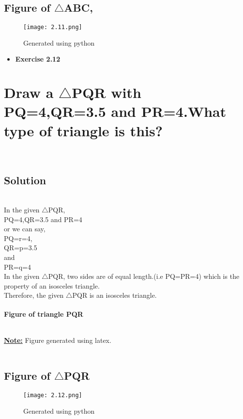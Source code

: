 \documentclass[a4paper,12pt]{article}
\begin{document}
\subsection{Figure of $\triangle$ABC,}
\begin{figure}[htp]
    \centering
    \texttt{[image: 2.11.png]}
    \caption{Generated using python}
    \label{fig:2}
\end{figure}
 \newpage
 \begin{itemize}
	    \item \Large\textbf{Exercise 2.12}
	\end{itemize}
	\section{Draw a $\triangle$PQR with PQ=4,QR=3.5 and PR=4.What type of triangle is this?}\\
    	
\subsection{Solution} \\
  In the given $\triangle$PQR, \\
   PQ=4,QR=3.5 and PR=4\\
   or we can say,\\
   PQ=r=4,\\QR=p=3.5\\ and\\ PR=q=4\\
  
   In the given $\triangle$PQR, two sides are of equal length.(i.e PQ=PR=4) \hspace{0.5cm}{or} \hspace{0.5cm}{(r=q=4)} which is the property of an isosceles triangle.\\
  
  Therefore, the given $\triangle$PQR is an isosceles triangle.\\
   \\
  
\textbf{Figure of triangle PQR}

\\
    \textbf{\underline{Note:}} {Figure generated using latex.}\\$$$$\\

\subsection{Figure of $\triangle$PQR}
\begin{figure}[htp]
    \centering
    \texttt{[image: 2.12.png]}
    \caption{Generated using python}
    \label{fig:2}
\end{figure}
\end{document}
